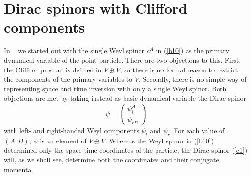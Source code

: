 \documentclass[a4paper,a4paper]{article}
\begin{document}
\section{Dirac spinors with Clifford components}
In ~\cite{borch4} we started out with the single Weyl spinor $c^{A}$ in
(\ref{b10}) as the primary dynamical variable of the point particle. There are
two objections to this. First, the Clifford product is defined in $V\oplus V$;
so there is no formal reason to restrict the components of the primary variables
to $V$. Secondly, there is no simple way of representing space and time
inversion with only a single Weyl spinor. Both objections are met by taking
instead as basic dynamical variable the Dirac spinor
\begin{equation} 
\psi = \left( \begin{array}{c} \psi _{l}^{A}\\ \psi _{r \dot{B}}
\end{array} \right)
\label{c1}
\end{equation}
with left- and right-handed Weyl components $\psi _{l}$ and $\psi _{r}$. For
each value of $(A,B)$, $\psi $ is an element of $V\oplus V$. Whereas the Weyl
spinor in (\ref{b10}) determined only the space-time coordinates of the
particle, the Dirac spinor (\ref{c1}) will, as we shall see, determine both the
coordinates and their conjugate momenta.
\end{document}
